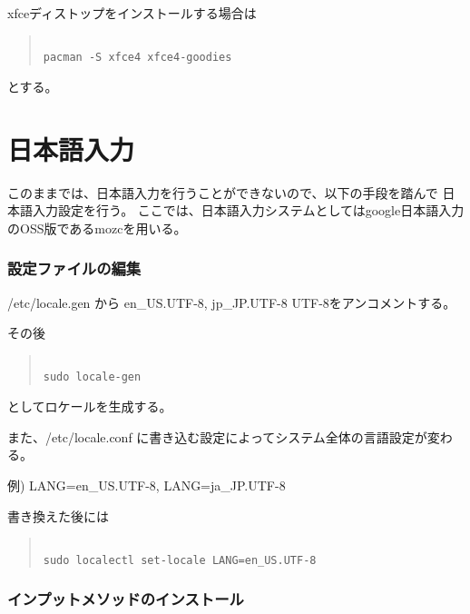 \documentclass[dvipdfmx]{jsarticle}
\begin{document}
xfceディストップをインストールする場合は

\begin{quote}
\begin{verbatim}

pacman -S xfce4 xfce4-goodies 

\end{verbatim}
\end{quote}
とする。

\section{日本語入力}

このままでは、日本語入力を行うことができないので、以下の手段を踏んで
日本語入力設定を行う。
ここでは、日本語入力システムとしてはgoogle日本語入力のOSS版であるmozcを用いる。

\subsubsection{設定ファイルの編集}

/etc/locale.gen から en\_US.UTF-8, jp\_JP.UTF-8 UTF-8をアンコメントする。

その後

\begin{quote}
\begin{verbatim}

sudo locale-gen

\end{verbatim}
\end{quote}

としてロケールを生成する。

また、/etc/locale.conf に書き込む設定によってシステム全体の言語設定が変わる。

例) LANG=en\_US.UTF-8, LANG=ja\_JP.UTF-8 


書き換えた後には

\begin{quote}
\begin{verbatim}

sudo localectl set-locale LANG=en_US.UTF-8

\end{verbatim}
\end{quote}

\subsubsection{インプットメソッドのインストール}
\end{document}
